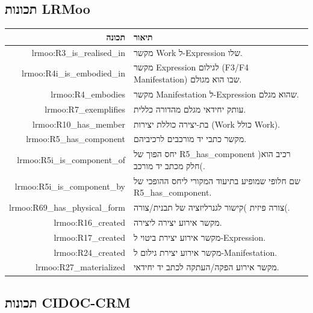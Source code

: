 \subsection{תכונות LRMoo}

\begin{longtable}{|r|p{8cm}|}
\hline
\textbf{תכונה} & \textbf{תיאור} \\
\hline
\endhead

lrmoo:R3\_is\_realised\_in & מקשר Work ל-Expression שלו.\\
\hline
lrmoo:R4i\_is\_embodied\_in & מקשר Expression לגילום \textenglish{(F3/F4 Manifestation)} שבו הוא מגולם.\\
\hline
lrmoo:R4\_embodies & מקשר Manifestation ל-Expression שהוא מגלם.\\
\hline
lrmoo:R7\_exemplifies & עותק יחידאי מגלם מהדורה כללית.\\
\hline
lrmoo:R10\_has\_member & בת-יצירה כוללת יצירות (Work כולל Work).\\
\hline
lrmoo:R5\_has\_component & מקשר כתבי יד מורכבים לרכיביהם.\\
\hline
lrmoo:R5i\_is\_component\_of & יחס הפוך של R5\_has\_component )רכיב הוא חלק מכתב יד מורכב(.\\
\hline
lrmoo:R5i\_is\_component\_by & שם חלופי שמופיע בתיעוד המקורי ליחס ההופכי של R5\_has\_component.\\
\hline
lrmoo:R69\_has\_physical\_form & צורה פיזית )קישור לגנרליזציה של תבנית/צורה(.\\
\hline
lrmoo:R16\_created & מקשר אירוע יצירה ליצירה.\\
\hline
lrmoo:R17\_created & מקשר אירוע יצירת ביטוי ל-Expression.\\
\hline
lrmoo:R24\_created & מקשר אירוע יצירת גילום ל-Manifestation.\\
\hline
lrmoo:R27\_materialized & מקשר אירוע הפקה/העתקה לכתב יד יחידאי.\\
\hline
\end{longtable}

\subsection{תכונות CIDOC-CRM}

